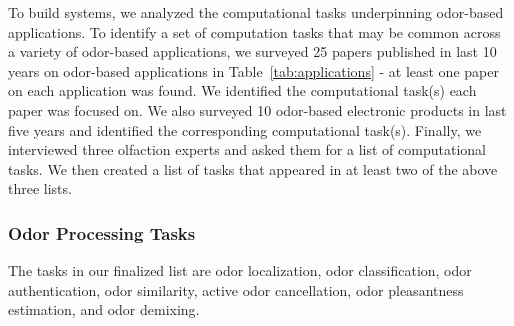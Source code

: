 To build \olfc{} systems, we analyzed the computational tasks underpinning
odor-based applications. To identify a set of computation tasks that may be
common across a variety of odor-based applications, we surveyed 25 papers
published in last 10 years on odor-based applications in
Table~\ref{tab:applications} - at least one paper on each application was
found. We identified the computational task(s) each paper was focused on. We
also surveyed 10 odor-based electronic products in last five years and
identified the corresponding computational task(s). Finally, we interviewed
three olfaction experts and asked them for a list of computational tasks. We
then created a list of tasks that appeared in at least two of the above three
lists.

\subsubsection{Odor Processing Tasks}
The tasks in our finalized list are odor localization, odor classification,
odor authentication, odor similarity, active odor cancellation, odor
pleasantness estimation, and odor demixing.

